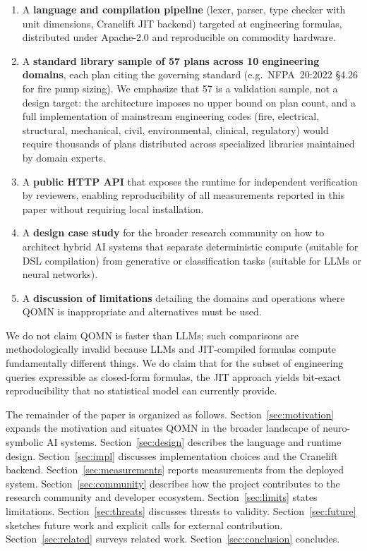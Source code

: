 \documentclass[11pt,a4paper]{article}
\begin{document}
\begin{enumerate}[leftmargin=*]
\item A \textbf{language and compilation pipeline} (lexer, parser, type checker with unit dimensions, Cranelift JIT backend) targeted at engineering formulas, distributed under Apache-2.0 and reproducible on commodity hardware.
\item A \textbf{standard library sample of 57 plans across 10 engineering domains}, each plan citing the governing standard (e.g.\ NFPA~20:2022 \S{}4.26 for fire pump sizing). We emphasize that 57 is a validation sample, not a design target: the architecture imposes no upper bound on plan count, and a full implementation of mainstream engineering codes (fire, electrical, structural, mechanical, civil, environmental, clinical, regulatory) would require thousands of plans distributed across specialized libraries maintained by domain experts.
\item A \textbf{public HTTP API} that exposes the runtime for independent verification by reviewers, enabling reproducibility of all measurements reported in this paper without requiring local installation.
\item A \textbf{design case study} for the broader research community on how to architect hybrid AI systems that separate deterministic compute (suitable for DSL compilation) from generative or classification tasks (suitable for LLMs or neural networks).
\item A \textbf{discussion of limitations} detailing the domains and operations where QOMN is inappropriate and alternatives must be used.
\end{enumerate}

We do not claim QOMN is faster than LLMs; such comparisons are methodologically invalid because LLMs and JIT-compiled formulas compute fundamentally different things. We do claim that for the subset of engineering queries expressible as closed-form formulas, the JIT approach yields bit-exact reproducibility that no statistical model can currently provide.

The remainder of the paper is organized as follows. Section~\ref{sec:motivation} expands the motivation and situates QOMN in the broader landscape of neuro-symbolic AI systems. Section~\ref{sec:design} describes the language and runtime design. Section~\ref{sec:impl} discusses implementation choices and the Cranelift backend. Section~\ref{sec:measurements} reports measurements from the deployed system. Section~\ref{sec:community} describes how the project contributes to the research community and developer ecosystem. Section~\ref{sec:limits} states limitations. Section~\ref{sec:threats} discusses threats to validity. Section~\ref{sec:future} sketches future work and explicit calls for external contribution. Section~\ref{sec:related} surveys related work. Section~\ref{sec:conclusion} concludes.
\end{document}
